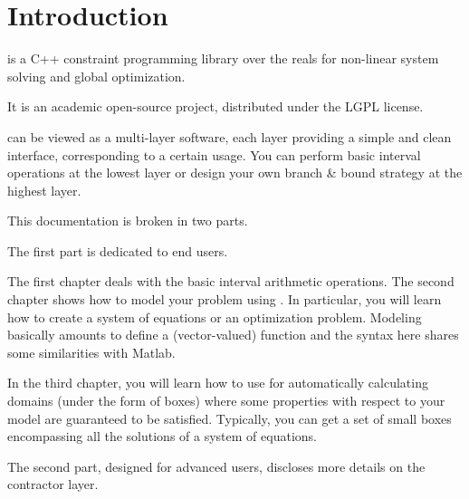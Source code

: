 \chapter{Introduction}


\ibex is a C++ constraint programming library over the reals for non-linear system solving and global optimization.

It is an academic open-source project, distributed under the LGPL license.

\ibex can be viewed as a multi-layer software, each layer providing a simple and clean interface, corresponding to a certain usage.
You can perform basic interval operations at the lowest layer or design your own branch \& bound strategy at the highest layer.

This documentation is broken in two parts. 

The first part is dedicated to end users.

The first chapter deals with the basic interval arithmetic operations.
The second chapter shows how to model your problem using \ibex.
In particular, you will learn how to create a system of equations or an optimization problem. Modeling basically amounts to
define a (vector-valued) function and the syntax here shares some similarities with Matlab.

In the third chapter, you will learn how to use \ibex for automatically calculating domains (under the form of boxes) where some 
properties with respect to your model are guaranteed to be satisfied. 
Typically, you can get a set of small boxes encompassing all the solutions of a system of equations.

The second part, designed for advanced users,  discloses more details on the contractor layer.
